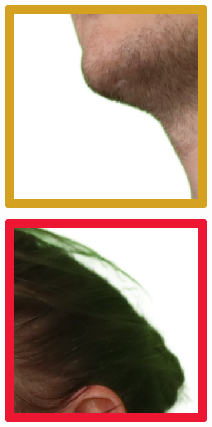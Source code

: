 \begin{figure}[h]
	\begin{subfigure}{0.2\linewidth}
		\includegraphics[width=\textwidth]{Figures/processed/cropped_masked_6-B-6-2-163452-598.png}
	\end{subfigure}
	\begin{subfigure}{0.2\linewidth}
		\includegraphics[width=\textwidth]{Figures/processed/cropped_masked_6-B-6-2-163452-598 (1).png}

\end{subfigure}
\end{figure}
